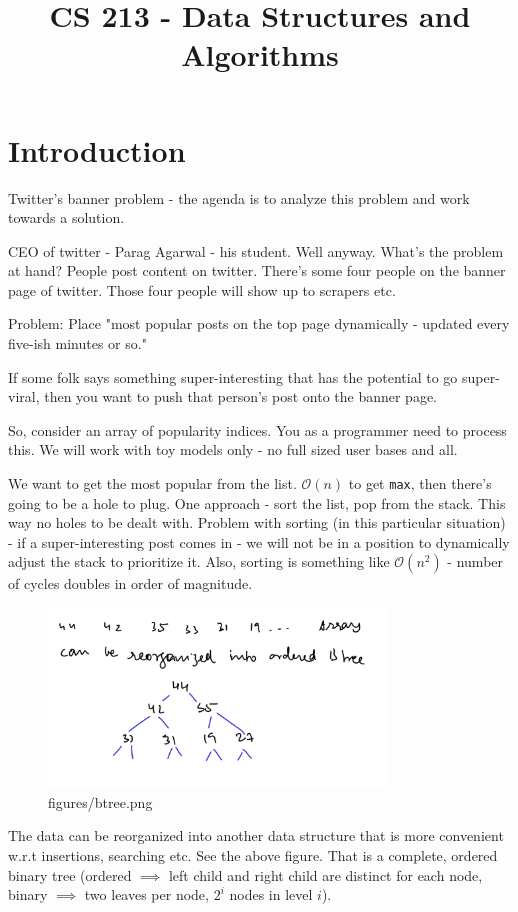 \documentclass[a4paper]{article}
\title{CS 213 - Data Structures and Algorithms}
\begin{document}
\maketitle	
\section{Introduction}
Twitter's banner problem - the agenda is to analyze this problem and
work towards a solution. 

CEO of twitter - Parag Agarwal - his student. Well anyway. What's the
problem at hand? People post content on twitter. There's some four people
on the banner page of twitter. Those four people will show up to scrapers etc.

Problem: Place "most popular  posts on the top page dynamically - updated every five-ish minutes or so."

If some folk says something super-interesting that has the potential
to go super-viral, then you want to push that person's post onto the
banner page.

So, consider an array of popularity indices. You as a programmer need
to process this. We will work with toy models only - no full sized
user bases and all.

We want to get the most popular from the list. $\mathcal{O}(n)$ to
get \texttt{max},  then there's going to be a hole to plug. One approach - 
sort the list, pop from the stack. This way no holes to be dealt with.
Problem with sorting (in this particular situation) - if a super-interesting post comes in - we will
not be in a position to dynamically adjust the stack to prioritize it.
Also, sorting is something like $\mathcal{O}(n^2)$ - number of cycles
doubles in order of magnitude.  

\begin{figure}[h]
	\centering
	\includegraphics[width=0.8\textwidth]{figures/btree.png}
	\caption{figures/btree.png}
	\label{fig:Ordered binary tree - root, left child, right child}
\end{figure}
The data can be reorganized into another data structure that is more
convenient w.r.t insertions, searching etc. See the above figure.
That is a complete, ordered binary tree (ordered $\implies$ left child
and right child are  distinct for each node, binary $\implies$ two leaves per node, $2^{i}$ nodes in level $i$).
\end{document}
